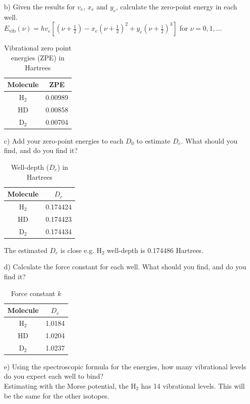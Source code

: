 \documentclass{article}
\begin{document}
\noindent b) Given the results for $v_e$, $x_e$ and $y_e$, calculate the zero-point
energy in each well.
\\
{\color{blue} $E_{\text{vib}}(\nu)=hv_e[(\nu+\frac{1}{2})-x_e(\nu+\frac{1}{2})^2+y_e(\nu+\frac{1}{2})^3]$
  for $\nu={0,1,...}$}
\begin{table}[H]
  \caption{Vibrational zero point energies (ZPE) in Hartrees}
  \centering
  \begin{tabular}{c|c}
    Molecule & ZPE \\
    \hline
    H$_2$ & 0.00989 \\
    HD    & 0.00858 \\
    D$_2$ & 0.00704
  \end{tabular}
\end{table}

\noindent c) Add your zero-point energies to each $D_0$ to estimate $D_e$. What should
you find, and do you find it?
\\
\begin{table}[H]
  \caption{Well-depth ($D_e$) in Hartrees}
  \centering
  \begin{tabular}{c|c}
    Molecule & $D_e$ \\
    \hline
    H$_2$ & 0.174424 \\
    HD    & 0.174423 \\
    D$_2$ & 0.174434
  \end{tabular}
\end{table}

{\color{blue} The estimated $D_e$ is close e.g. H$_2$ well-depth is 0.174486 Hartrees.}

\noindent d) Calculate the force constant for each well. What should you find,
and do you find it?

\begin{table}[H]
  \caption{Force constant $k$}
  \centering
  \begin{tabular}{c|c}
    Molecule & $D_e$ \\
    \hline
    H$_2$ & 1.0184 \\
    HD    & 1.0204 \\
    D$_2$ & 1.0237
  \end{tabular}
\end{table}

\noindent e) Using the spectroscopic formula for the energies, how many vibrational
levels do you expect each well to bind?
\\

{\color{blue} Estimating with the Morse potential, the H$_2$
  has 14 vibrational levels. This will be the same for the other
  isotopes.
}
\end{document}
